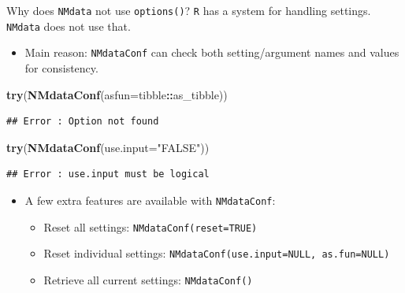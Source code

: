 \documentclass[
  8pt,
  ignorenonframetext,
  aspectratio=169]{beamer}
\newenvironment{Shaded}{\begin{snugshade}}{\end{snugshade}}
\newcommand{\DataTypeTok}[1]{\textcolor[rgb]{0.13,0.29,0.53}{#1}}
\newcommand{\KeywordTok}[1]{\textcolor[rgb]{0.13,0.29,0.53}{\textbf{#1}}}
\newcommand{\NormalTok}[1]{#1}
\newcommand{\OperatorTok}[1]{\textcolor[rgb]{0.81,0.36,0.00}{\textbf{#1}}}
\newcommand{\StringTok}[1]{\textcolor[rgb]{0.31,0.60,0.02}{#1}}
\providecommand{\tightlist}{%
  \setlength{\itemsep}{0pt}\setlength{\parskip}{0pt}}
\begin{document}
\begin{frame}[fragile]{Why does \texttt{NMdata} not use
\texttt{options()}?}
\protect\hypertarget{why-does-nmdata-not-use-options}{}
\texttt{R} has a system for handling settings. \texttt{NMdata} does not
use that.

\begin{itemize}
\tightlist
\item
  Main reason: \texttt{NMdataConf} can check both setting/argument names
  and values for consistency.
\end{itemize}

\begin{Shaded}
\begin{Highlighting}[]
\KeywordTok{try}\NormalTok{(}\KeywordTok{NMdataConf}\NormalTok{(}\DataTypeTok{asfun=}\NormalTok{tibble}\OperatorTok{::}\NormalTok{as\_tibble))}
\end{Highlighting}
\end{Shaded}

\begin{verbatim}
## Error : Option not found
\end{verbatim}

\begin{Shaded}
\begin{Highlighting}[]
\KeywordTok{try}\NormalTok{(}\KeywordTok{NMdataConf}\NormalTok{(}\DataTypeTok{use.input=}\StringTok{"FALSE"}\NormalTok{))}
\end{Highlighting}
\end{Shaded}

\begin{verbatim}
## Error : use.input must be logical
\end{verbatim}

\begin{itemize}
\tightlist
\item
  A few extra features are available with \texttt{NMdataConf}:

  \begin{itemize}
  \tightlist
  \item
    Reset all settings: \texttt{NMdataConf(reset=TRUE)}
  \item
    Reset individual settings:
    \texttt{NMdataConf(use.input=NULL,\ as.fun=NULL)}
  \item
    Retrieve all current settings: \texttt{NMdataConf()}
  \end{itemize}
\end{itemize}
\end{frame}
\end{document}
